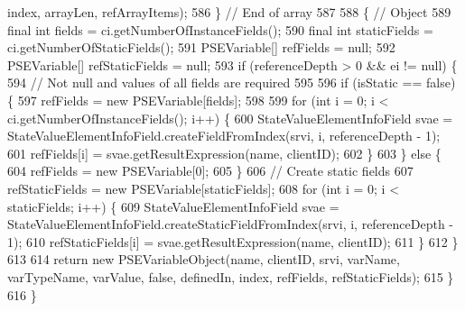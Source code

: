 \begin{DoxyCode}
      index, arrayLen, refArrayItems);
586     \} \textcolor{comment}{// End of array}
587 
588     \{ \textcolor{comment}{// Object}
589       \textcolor{keyword}{final} \textcolor{keywordtype}{int} fields = ci.getNumberOfInstanceFields();
590       \textcolor{keyword}{final} \textcolor{keywordtype}{int} staticFields = ci.getNumberOfStaticFields();
591       PSEVariable[] refFields = null;
592       PSEVariable[] refStaticFields = null;
593       \textcolor{keywordflow}{if} (referenceDepth > 0 && ei != null) \{
594         \textcolor{comment}{// Not null and values of all fields are required}
595 
596         \textcolor{keywordflow}{if} (isStatic == \textcolor{keyword}{false}) \{
597           refFields = \textcolor{keyword}{new} PSEVariable[fields];
598 
599           \textcolor{keywordflow}{for} (\textcolor{keywordtype}{int} i = 0; i < ci.getNumberOfInstanceFields(); i++) \{
600             StateValueElementInfoField svae = StateValueElementInfoField.createFieldFromIndex(srvi, i, 
      referenceDepth - 1);
601             refFields[i] = svae.getResultExpression(name, clientID);
602           \}
603         \} \textcolor{keywordflow}{else} \{
604           refFields = \textcolor{keyword}{new} PSEVariable[0];
605         \}
606         \textcolor{comment}{// Create static fields}
607         refStaticFields = \textcolor{keyword}{new} PSEVariable[staticFields];
608         \textcolor{keywordflow}{for} (\textcolor{keywordtype}{int} i = 0; i < staticFields; i++) \{
609           StateValueElementInfoField svae = StateValueElementInfoField.createStaticFieldFromIndex(srvi, i, 
      referenceDepth - 1);
610           refStaticFields[i] = svae.getResultExpression(name, clientID);
611         \}
612       \}
613 
614       \textcolor{keywordflow}{return} \textcolor{keyword}{new} PSEVariableObject(name, clientID, srvi, varName, varTypeName, varValue, \textcolor{keyword}{false}, definedIn, 
      index, refFields, refStaticFields);
615     \}
616   \}
\end{DoxyCode}
